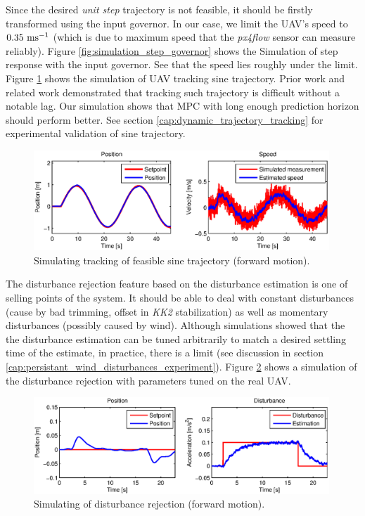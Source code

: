 Since the desired \emph{unit step} trajectory is not feasible, it should be firstly transformed using the input governor. In our case, we limit the UAV's speed to $0.35~\mathrm{ms^{-1}}$ (which is due to maximum speed that the \emph{px4flow} sensor can measure reliably). Figure \ref{fig:simulation_step_governor} shows the Simulation of step response with the input governor. See that the speed lies roughly under the limit. Figure \ref{fig:simulation_sine} shows the simulation of UAV tracking sine trajectory. Prior work \citep{baca2013, endrych2014} and related work \citep{bangura2014realtimempc} demonstrated that tracking such trajectory is difficult without a notable lag. Our simulation shows that MPC with long enough prediction horizon should perform better. See section \ref{cap:dynamic_trajectory_tracking} for experimental validation of sine trajectory.

\begin{figure}[H]
\centering
\includegraphics[width=0.99\textwidth]{fig/simulation3_sine.eps}
\caption{Simulating tracking of feasible sine trajectory (forward motion).}
\label{fig:simulation_sine}
\end{figure}

The disturbance rejection feature based on the disturbance estimation is one of selling points of the system. It should be able to deal with constant disturbances (cause by bad trimming, offset in \emph{KK2} stabilization) as well as momentary disturbances (possibly caused by wind). Although simulations showed that the the disturbance estimation can be tuned arbitrarily to match a desired settling time of the estimate, in practice, there is a limit (see discussion in section \ref{cap:persistant_wind_disturbances_experiment}). Figure \ref{fig:simulation_disturbance_rejection} shows a simulation of the disturbance rejection with parameters tuned on the real UAV.

\begin{figure}[H]
\centering
\includegraphics[width=0.99\textwidth]{fig/simulation4_disturbance_rejection.eps}
\caption{Simulating of disturbance rejection (forward motion).}
\label{fig:simulation_disturbance_rejection}
\end{figure}

